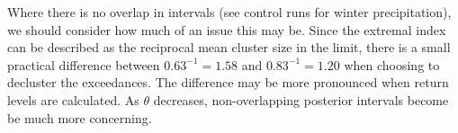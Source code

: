 Where there is no overlap in intervals (see control runs for winter precipitation), we should consider how much of an issue this may be. Since the extremal index can be described as the reciprocal mean cluster size in the limit, there is a small practical difference between $0.63^{-1}=1.58$ and $0.83^{-1}=1.20$ when choosing to decluster the exceedances. The difference may be more pronounced when return levels are calculated. As $\theta$ decreases, non-overlapping posterior intervals become be much more concerning.
